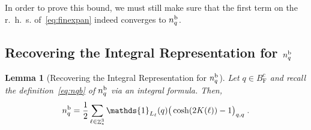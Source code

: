 \documentclass[12pt,a4paper]{article}
\numberwithin{equation}{section}
\newcommand{\1}{\mathbb{I}}
\renewcommand{\b}{\textnormal{b}}
\newcommand{\F}{\mathrm{F}}
\DeclareMathOperator{\Z}{\mathbb{Z}}
\newcommand{\half}{\frac{1}{2}}
\theoremstyle{plain}
\newtheorem{lemma}[theorem]{Lemma}
\theoremstyle{definition}
\theoremstyle{remark}
\theoremstyle{plain}
\theoremstyle{definition}
\theoremstyle{remark}
\begin{document}
In order to prove this bound, we must still make sure that the first term on the r.~h.~s. of~\eqref{eq:finexpan} indeed converges to $ n_q^{\b} $.


\subsection{Recovering the Integral Representation for $ n_q^{\b} $}

\begin{lemma}[Recovering the Integral Representation for $ n_q^{\b} $] \label{lem:nqb_integralrecovery}
Let $q \in B^c_{\F}$ and recall the definition~\eqref{eq:nqb} of $ n_q^{\b} $ via an integral formula. Then,
\begin{equation} \label{eq:nqb_integralrecovery}
	n_q^{\b} = \half\sum\limits_{\ell\in \Z^3_*}\mathds{1}_{L_\ell}(q) \big( \cosh(2K(\ell)) - 1 \big)_{q,q} \;.
\end{equation}
\end{lemma}
\end{document}
